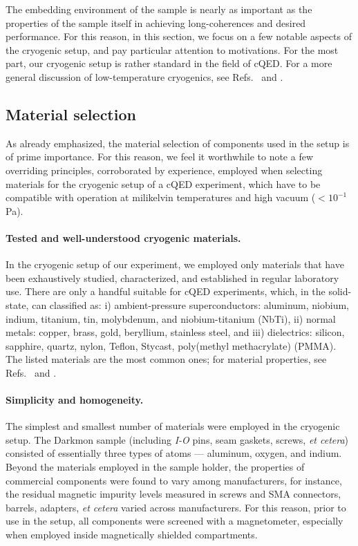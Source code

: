 The embedding environment of the sample is nearly as important as
the properties of the sample itself in achieving long-coherences and
desired performance. For this reason, in this section, we focus on
a few notable aspects of the cryogenic setup, and pay particular attention
to motivations. For the most part, our cryogenic setup is rather standard
in the field of cQED. For a more general discussion of low-temperature
cryogenics, see Refs.~\citet{ventura2010book} and \citet{pobell2013book}.

\subsection{Material selection\label{subsec:Material-selection}}

As already emphasized, the material selection of components used in
the setup is of prime importance. For this reason, we feel it worthwhile
to note a few overriding principles, corroborated by experience, employed
when selecting materials for the cryogenic setup of a cQED experiment,
which have to be compatible with operation at milikelvin temperatures
and high vacuum ($<10^{-1}$ \,Pa).

\paragraph{Tested and well-understood cryogenic materials. }

In the cryogenic setup of our experiment, we employed only materials
that have been exhaustively studied, characterized, and established
in regular laboratory use. There are only a handful suitable for cQED
experiments, which, in the solid-state, can classified as: i) ambient-pressure
superconductors: aluminum, niobium, indium, titanium, tin, molybdenum,
and niobium-titanium (NbTi), ii) normal metals: copper, brass, gold,
beryllium, stainless steel, and iii) dielectrics: silicon, sapphire,
quartz, nylon, Teflon, Stycast, poly(methyl methacrylate) (PMMA).
The listed materials are the most common ones; for material properties,
see Refs.~\citet{ventura2010book} and \citet{pobell2013book}. 

\paragraph*{Simplicity and homogeneity.}

The simplest and smallest number of materials were employed in the
cryogenic setup. The Darkmon sample (including \emph{I-O} pins, seam
gaskets, screws, \emph{et cetera})  consisted of essentially three
types of atoms — aluminum, oxygen, and indium. Beyond the materials
employed in the sample holder, the properties of commercial components
were found to vary among manufacturers, for instance, the residual
magnetic impurity levels measured in screws and SMA connectors, barrels,
adapters, \emph{et cetera} varied across manufacturers. For this reason,
prior to use in the setup, all components were screened with a magnetometer,
especially when employed inside magnetically shielded compartments.

